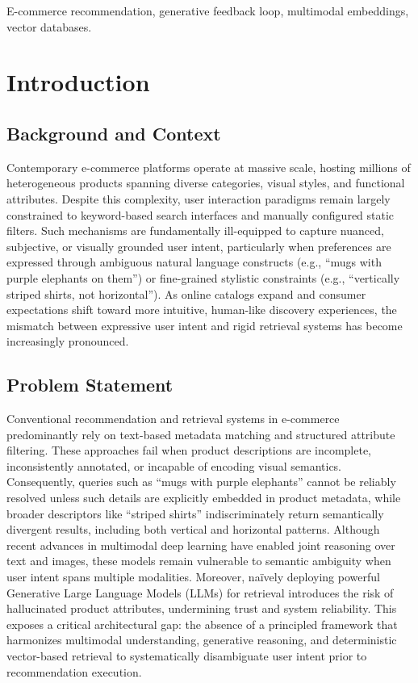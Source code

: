 \documentclass[conference]{IEEEtran}
\begin{document}
\begin{IEEEkeywords}
E-commerce recommendation,
generative feedback loop, multimodal embeddings,
vector databases.
\end{IEEEkeywords}
\section{Introduction}
\subsection{Background and Context}
Contemporary e-commerce platforms operate at massive scale, hosting millions of heterogeneous products spanning diverse categories, visual styles, and functional attributes. Despite this complexity, user interaction paradigms remain largely constrained to keyword-based search interfaces and manually configured static filters. Such mechanisms are fundamentally ill-equipped to capture nuanced, subjective, or visually grounded user intent, particularly when preferences are expressed through ambiguous natural language constructs (e.g., “mugs with purple elephants on them”) or fine-grained stylistic constraints (e.g., “vertically striped shirts, not horizontal”). As online catalogs expand and consumer expectations shift toward more intuitive, human-like discovery experiences, the mismatch between expressive user intent and rigid retrieval systems has become increasingly pronounced.

\subsection{Problem Statement}

Conventional recommendation and retrieval systems in e-commerce predominantly rely on text-based metadata matching and structured attribute filtering. These approaches fail when product descriptions are incomplete, inconsistently annotated, or incapable of encoding visual semantics. Consequently, queries such as “mugs with purple elephants” cannot be reliably resolved unless such details are explicitly embedded in product metadata, while broader descriptors like “striped shirts” indiscriminately return semantically divergent results, including both vertical and horizontal patterns. Although recent advances in multimodal deep learning have enabled joint reasoning over text and images, these models remain vulnerable to semantic ambiguity when user intent spans multiple modalities. Moreover, naïvely deploying powerful Generative Large Language Models (LLMs) for retrieval introduces the risk of hallucinated product attributes, undermining trust and system reliability. This exposes a critical architectural gap: the absence of a principled framework that harmonizes multimodal understanding, generative reasoning, and deterministic vector-based retrieval to systematically disambiguate user intent prior to recommendation execution.
\end{document}
